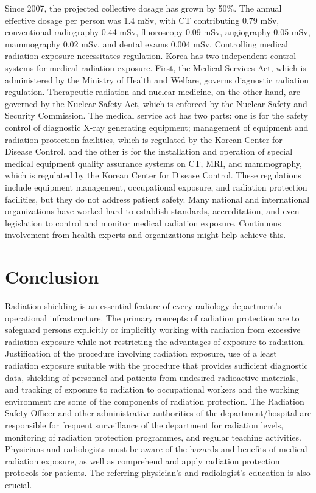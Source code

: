 \documentclass{article}
\begin{document}
\large Since 2007, the projected collective dosage has grown by 50\%. The annual effective dosage per person was 1.4 mSv, with CT contributing 0.79 mSv, conventional radiography 0.44 mSv, fluoroscopy 0.09 mSv, angiography 0.05 mSv, mammography 0.02 mSv, and dental exams 0.004 mSv. Controlling medical radiation exposure necessitates regulation. Korea has two independent control systems for medical radiation exposure. First, the Medical Services Act, which is administered by the Ministry of Health and Welfare, governs diagnostic radiation regulation. Therapeutic radiation and nuclear medicine, on the other hand, are governed by the Nuclear Safety Act, which is enforced by the Nuclear Safety and Security Commission. The medical service act has two parts: one is for the safety control of diagnostic X-ray generating equipment; management of equipment and radiation protection facilities, which is regulated by the Korean Center for Disease Control, and the other is for the installation and operation of special medical equipment quality assurance systems on CT, MRI, and mammography, which is regulated by the Korean Center for Disease Control. These regulations include equipment management, occupational exposure, and radiation protection facilities, but they do not address patient safety. Many national and international organizations have worked hard to establish standards, accreditation, and even legislation to control and monitor medical radiation exposure. Continuous involvement from health experts and organizations might help achieve this. 

\section{Conclusion}

\large Radiation shielding is an essential feature of every radiology department's operational infrastructure. The primary concepts of radiation protection are to safeguard persons explicitly or implicitly working with radiation from excessive radiation exposure while not restricting the advantages of exposure to radiation. Justification of the procedure involving radiation exposure, use of a least radiation exposure suitable with the procedure that provides sufficient diagnostic data, shielding of personnel and patients from undesired radioactive materials, and tracking of exposure to radiation to occupational workers and the working environment are some of the components of radiation protection. The Radiation Safety Officer and other administrative authorities of the department/hospital are responsible for frequent surveillance of the department for radiation levels, monitoring of radiation protection programmes, and regular teaching activities. Physicians and radiologists must be aware of the hazards and benefits of medical radiation exposure, as well as comprehend and apply radiation protection protocols for patients. The referring physician's and radiologist's education is also crucial.
\end{document}
